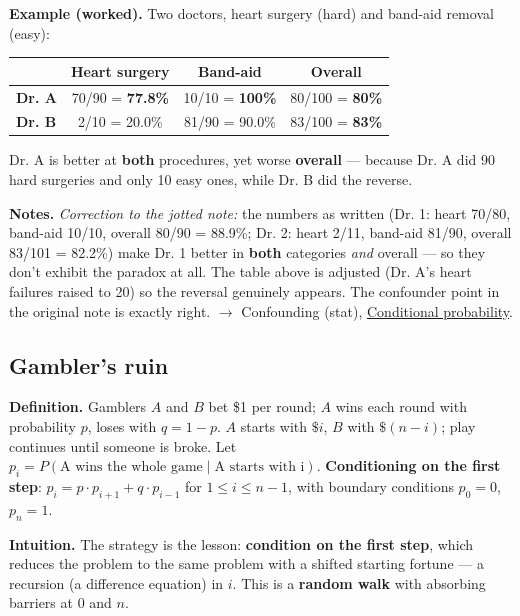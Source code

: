 \documentclass[11pt,a4paper]{article}
\begin{document}
\textbf{Example (worked).} Two doctors, heart surgery (hard) and band-aid removal (easy):

\begin{center}\begin{tabular}{@{}lccc@{}}\toprule
 & Heart surgery & Band-aid & \textbf{Overall} \\
\midrule
\textbf{Dr. A} & 70/90 = \textbf{77.8\%} & 10/10 = \textbf{100\%} & 80/100 = \textbf{80\%} \\
\textbf{Dr. B} & 2/10 = 20.0\% & 81/90 = 90.0\% & 83/100 = \textbf{83\%} \\
\bottomrule\end{tabular}\end{center}

Dr. A is better at \textbf{both} procedures, yet worse \textbf{overall} --- because Dr. A did 90 hard surgeries and only 10 easy ones, while Dr. B did the reverse.

\textbf{Notes.} \textit{Correction to the jotted note:} the numbers as written (Dr. 1: heart 70/80, band-aid 10/10, overall 80/90 = 88.9\%; Dr. 2: heart 2/11, band-aid 81/90, overall 83/101 = 82.2\%) make Dr. 1 better in \textbf{both} categories \textit{and} overall --- so they don't exhibit the paradox at all. The table above is adjusted (Dr. A's heart failures raised to 20) so the reversal genuinely appears. The confounder point in the original note is exactly right. $\to$ Confounding (stat), \hyperref[sec:conditional-probability]{Conditional probability}.

\subsection{Gambler's ruin}\label{sec:gamblers-ruin}

\textbf{Definition.} Gamblers $A$ and $B$ bet \$1 per round; $A$ wins each round with probability $p$, loses with $q = 1 - p$. $A$ starts with $\$i$, $B$ with $\$(n - i)$; play continues until someone is broke. Let $p_{i} = P(\text{A wins the whole game} \mid \text{A starts with i})$. \textbf{Conditioning on the first step}:
$p_{i} = p\cdot p_{i+1} + q\cdot p_{i-1}$ for $1 \leq  i \leq  n-1$, with boundary conditions $p_{0} = 0$, $p_{n} = 1$.

\textbf{Intuition.} The strategy is the lesson: \textbf{condition on the first step}, which reduces the problem to the same problem with a shifted starting fortune --- a recursion (a difference equation) in $i$. This is a \textbf{random walk} with absorbing barriers at 0 and $n$.
\end{document}

